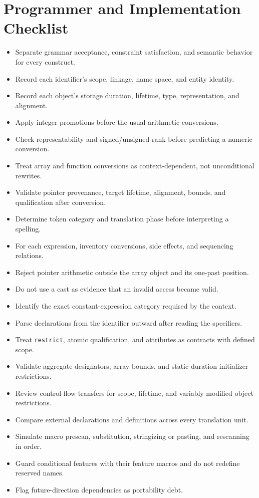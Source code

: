 \documentclass[10pt,letterpaper]{article}
\begin{document}
\section{Programmer and Implementation Checklist}
\begin{itemize}
  \item[$\square$] Separate grammar acceptance, constraint satisfaction, and semantic behavior for every construct.
  \item[$\square$] Record each identifier's scope, linkage, name space, and entity identity.
  \item[$\square$] Record each object's storage duration, lifetime, type, representation, and alignment.
  \item[$\square$] Apply integer promotions before the usual arithmetic conversions.
  \item[$\square$] Check representability and signed/unsigned rank before predicting a numeric conversion.
  \item[$\square$] Treat array and function conversions as context-dependent, not unconditional rewrites.
  \item[$\square$] Validate pointer provenance, target lifetime, alignment, bounds, and qualification after conversion.
  \item[$\square$] Determine token category and translation phase before interpreting a spelling.
  \item[$\square$] For each expression, inventory conversions, side effects, and sequencing relations.
  \item[$\square$] Reject pointer arithmetic outside the array object and its one-past position.
  \item[$\square$] Do not use a cast as evidence that an invalid access became valid.
  \item[$\square$] Identify the exact constant-expression category required by the context.
  \item[$\square$] Parse declarations from the identifier outward after reading the specifiers.
  \item[$\square$] Treat \texttt{restrict}, atomic qualification, and attributes as contracts with defined scope.
  \item[$\square$] Validate aggregate designators, array bounds, and static-duration initializer restrictions.
  \item[$\square$] Review control-flow transfers for scope, lifetime, and variably modified object restrictions.
  \item[$\square$] Compare external declarations and definitions across every translation unit.
  \item[$\square$] Simulate macro prescan, substitution, stringizing or pasting, and rescanning in order.
  \item[$\square$] Guard conditional features with their feature macros and do not redefine reserved names.
  \item[$\square$] Flag future-direction dependencies as portability debt.
\end{itemize}
\end{document}
